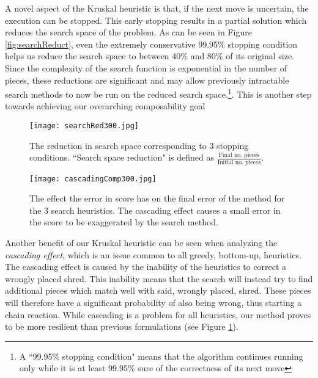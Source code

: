 \documentclass{llncs}
\begin{document}
A novel aspect of the Kruskal heuristic is that, if the next move is uncertain, the execution can be stopped. This early stopping results in a partial solution which reduces the search space of the problem. As can be seen in Figure \ref{fig:searchReduct}, even the extremely conservative 99.95\% stopping condition helps us reduce the search space to between 40\% and 80\% of its original size. Since the complexity of the search function is exponential in the number of pieces, these reductions are significant and may allow previously intractable search methods to now be run on the reduced search space.\footnote{A ``99.95\% stopping condition" means that the algorithm continues running only while it is at least 99.95\% sure of the correctness of its next move}. This is another step towards achieving our overarching composability goal

\begin{figure}[t]
    \centering
    \begin{minipage}[b]{0.48\textwidth}
        \centering
        \texttt{[image: searchRed300.jpg]}
        \caption{The reduction in search space corresponding to 3 stopping conditions. ``Search space reduction" is defined as $\frac{\mbox{Final no. pieces}}{\mbox{Initial no. pieces}}$.}
        \label{fig:searchReduct}
    \end{minipage}
    \hfill
    \begin{minipage}[b]{0.48\textwidth}
        \centering
        \texttt{[image: cascadingComp300.jpg]}
        \caption{The effect the error in score has on the final error of the method for the 3 search heuristics. The cascading effect causes a small error in the score to be exaggerated by the search method.}
        \label{fig:cascading}
    \end{minipage}
\end{figure}

Another benefit of our Kruskal heuristic can be seen when analyzing the \emph{cascading effect}, which is an issue common to all greedy, bottom-up, heuristics. The cascading effect is caused by the inability of the heuristics to correct a wrongly placed shred. This inability means that the search will instead try to find additional pieces which match well with said, wrongly placed, shred. These pieces will therefore have a significant probability of also being wrong, thus starting a chain reaction. While cascading is a problem for all heuristics, our method proves to be more resilient than previous formulations (see Figure \ref{fig:cascading}).
\end{document}
